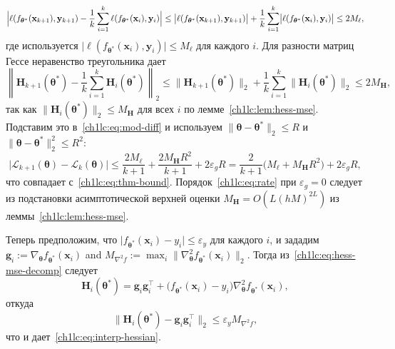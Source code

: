 \[
  \Bigl|\ell(f_{\boldsymbol{\theta}^*}(\mathbf{x}_{k+1}),\mathbf{y}_{k+1}) - \frac{1}{k}\sum_{i=1}^{k}\ell(f_{\boldsymbol{\theta}^*}(\mathbf{x}_{i}),\mathbf{y}_{i})\Bigr|
  \le \bigl|\ell(f_{\boldsymbol{\theta}^*}(\mathbf{x}_{k+1}),\mathbf{y}_{k+1})\bigr|
  + \frac{1}{k}\sum_{i=1}^{k}\bigl|\ell(f_{\boldsymbol{\theta}^*}(\mathbf{x}_{i}),\mathbf{y}_{i})\bigr|
  \le 2M_{\ell},
\]
где используется $\bigl|\ell(f_{\boldsymbol{\theta}^*}(\mathbf{x}_{i}),\mathbf{y}_i)\bigr|\le M_{\ell}$ для каждого $i$.
Для разности матриц Гессе неравенство треугольника дает
\[
  \left\| \mathbf{H}_{k+1}(\boldsymbol{\theta}^*) - \frac{1}{k}\sum_{i=1}^{k}\mathbf{H}_i(\boldsymbol{\theta}^*) \right\|_2
  \le \|\mathbf{H}_{k+1}(\boldsymbol{\theta}^*)\|_2 + \frac{1}{k}\sum_{i=1}^{k}\|\mathbf{H}_i(\boldsymbol{\theta}^*)\|_2
  \le 2M_{\mathbf{H}},
\]
так как $\|\mathbf{H}_i(\boldsymbol{\theta}^*)\|_2\le M_{\mathbf{H}}$ для всех $i$ по лемме~\ref{ch1lc:lem:hess-mse}.
Подставим это в~\eqref{ch1lc:eq:mod-diff} и используем $\|\boldsymbol{\theta}-\boldsymbol{\theta}^*\|_2\le R$ и $\|\boldsymbol{\theta}-\boldsymbol{\theta}^*\|_2^2\le R^2$:
\[
  \bigl|\mathcal{L}_{k+1}(\boldsymbol{\theta}) - \mathcal{L}_k(\boldsymbol{\theta})\bigr|
  \le \frac{2M_{\ell}}{k+1} + \frac{2M_{\mathbf{H}}R^2}{k+1} + 2\varepsilon_g R
  = \frac{2}{k+1}\bigl(M_{\ell} + M_{\mathbf{H}}R^2\bigr) + 2\varepsilon_g R ,
\]
что совпадает с~\eqref{ch1lc:eq:thm-bound}. Порядок~\eqref{ch1lc:eq:rate} при $\varepsilon_g=0$ следует из подстановки асимптотической верхней оценки
$M_{\mathbf{H}}=O(L(hM)^{2L})$ из леммы~\ref{ch1lc:lem:hess-mse}.

Теперь предположим, что $\bigl|f_{\boldsymbol{\theta}^*}(\mathbf{x}_i)-y_i\bigr|\le \varepsilon_y$ для каждого $i$, и зададим
$\mathbf{g}_i:=\nabla_{\boldsymbol{\theta}}f_{\boldsymbol{\theta}^*}(\mathbf{x}_i)$ and
$M_{\nabla^2 f}:=\max_i\|\nabla_{\boldsymbol{\theta}}^2f_{\boldsymbol{\theta}^*}(\mathbf{x}_i)\|_2$.
Тогда из~\eqref{ch1lc:eq:hess-mse-decomp} следует
\[
  \mathbf{H}_i(\boldsymbol{\theta}^*)
  = \mathbf{g}_i\mathbf{g}_i^\top
  + \bigl(f_{\boldsymbol{\theta}^*}(\mathbf{x}_i)-y_i\bigr)\nabla_{\boldsymbol{\theta}}^2 f_{\boldsymbol{\theta}^*}(\mathbf{x}_i),
\]
откуда
\[
  \bigl\|
    \mathbf{H}_i(\boldsymbol{\theta}^*)
    - \mathbf{g}_i\mathbf{g}_i^\top
  \bigr\|_2
  \le \varepsilon_y M_{\nabla^2 f},
\]
что и дает~\eqref{ch1lc:eq:interp-hessian}.

